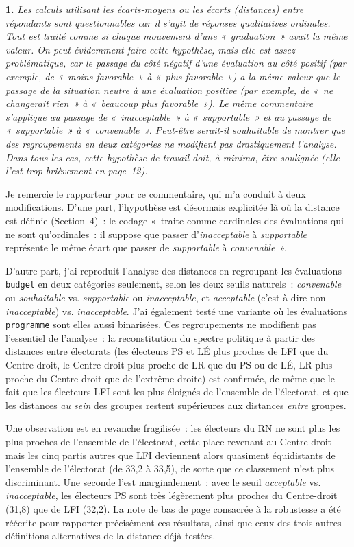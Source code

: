 \documentclass[12pt,french]{article}
\begin{document}
\bigskip
\noindent\textbf{1.} \textit{Les calculs utilisant les écarts-moyens ou les écarts (distances) entre répondants sont questionnables car il s'agit de réponses qualitatives ordinales. Tout est traité comme si chaque mouvement d'une «~graduation~» avait la même valeur. On peut évidemment faire cette hypothèse, mais elle est assez problématique, car le passage du côté négatif d'une évaluation au côté positif (par exemple, de «~moins favorable~» à «~plus favorable~») a la même valeur que le passage de la situation neutre à une évaluation positive (par exemple, de «~ne changerait rien~» à «~beaucoup plus favorable~»). Le même commentaire s'applique au passage de «~inacceptable~» à «~supportable~» et au passage de «~supportable~» à «~convenable~». Peut-être serait-il souhaitable de montrer que des regroupements en deux catégories ne modifient pas drastiquement l'analyse. Dans tous les cas, cette hypothèse de travail doit, à minima, être soulignée (elle l'est trop brièvement en page~12).}

Je remercie le rapporteur pour ce commentaire, qui m'a conduit à deux modifications. D'une part, l'hypothèse est désormais explicitée là où la distance est définie (Section~4)~: le codage «~traite comme cardinales des évaluations qui ne sont qu'ordinales~: il suppose que passer d'\textit{inacceptable} à \textit{supportable} représente le même écart que passer de \textit{supportable} à \textit{convenable}~».

D'autre part, j'ai reproduit l'analyse des distances en regroupant les évaluations \texttt{budget} en deux catégories seulement, selon les deux seuils naturels~: \textit{convenable} ou \textit{souhaitable} vs. \textit{supportable} ou \textit{inacceptable}, et \textit{acceptable} (c'est-à-dire non-\textit{inacceptable}) vs. \textit{inacceptable}. J'ai également testé une variante où les évaluations \texttt{programme} sont elles aussi binarisées. Ces regroupements ne modifient pas l'essentiel de l'analyse~: la reconstitution du spectre politique à partir des distances entre électorats (les électeurs PS et LÉ plus proches de LFI que du Centre-droit, le Centre-droit plus proche de LR que du PS ou de LÉ, LR plus proche du Centre-droit que de l'extrême-droite) est confirmée, de même que le fait que les électeurs LFI sont les plus éloignés de l'ensemble de l'électorat, et que les distances \textit{au sein} des groupes restent supérieures aux distances \textit{entre} groupes.

Une observation est en revanche fragilisée~: les électeurs du RN ne sont plus les plus proches de l'ensemble de l'électorat, cette place revenant au Centre-droit -- mais les cinq partis autres que LFI deviennent alors quasiment équidistants de l'ensemble de l'électorat (de 33,2 à 33,5), de sorte que ce classement n'est plus discriminant. Une seconde l'est marginalement~: avec le seuil \textit{acceptable} vs. \textit{inacceptable}, les électeurs PS sont très légèrement plus proches du Centre-droit (31,8) que de LFI (32,2). La note de bas de page consacrée à la robustesse a été réécrite pour rapporter précisément ces résultats, ainsi que ceux des trois autres définitions alternatives de la distance déjà testées.
\end{document}
